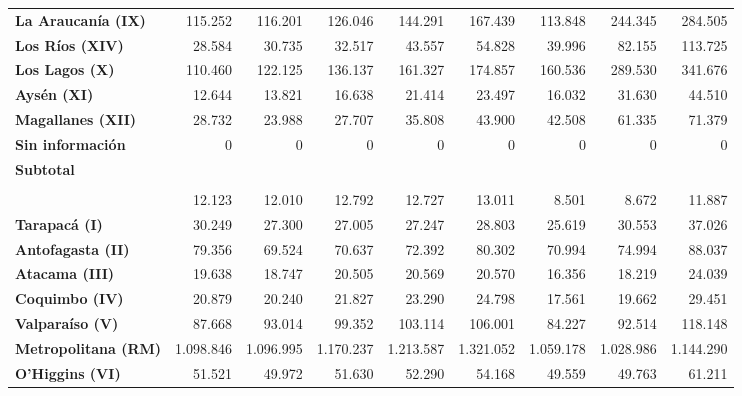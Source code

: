 \documentclass[
  letterpaper,
  DIV=11,
  numbers=noendperiod]{scrartcl}
\begin{document}
\begin{table}
\begin{tabular*}{\linewidth}{@{\extracolsep{\fill}}l|rrrrrrrr}
{\bfseries La Araucanía (IX)} & 115.252 & 116.201 & 126.046 & 144.291 & 167.439 & 113.848 & 244.345 & 284.505 \\ 
{\bfseries Los Ríos (XIV)} & 28.584 & 30.735 & 32.517 & 43.557 & 54.828 & 39.996 & 82.155 & 113.725 \\ 
{\bfseries Los Lagos (X)} & 110.460 & 122.125 & 136.137 & 161.327 & 174.857 & 160.536 & 289.530 & 341.676 \\ 
{\bfseries Aysén (XI)} & 12.644 & 13.821 & 16.638 & 21.414 & 23.497 & 16.032 & 31.630 & 44.510 \\ 
{\bfseries Magallanes (XII)} & 28.732 & 23.988 & 27.707 & 35.808 & 43.900 & 42.508 & 61.335 & 71.379 \\ 
{\bfseries Sin información} & 0 & 0 & 0 & 0 & 0 & 0 & 0 & 0 \\ 
{\bfseries Subtotal} & {\bfseries \cellcolor[HTML]{F2F2F2}{3.159.058}} & {\bfseries \cellcolor[HTML]{F2F2F2}{3.348.560}} & {\bfseries \cellcolor[HTML]{F2F2F2}{3.664.072}} & {\bfseries \cellcolor[HTML]{F2F2F2}{4.005.604}} & {\bfseries \cellcolor[HTML]{F2F2F2}{4.311.164}} & {\bfseries \cellcolor[HTML]{F2F2F2}{4.310.302}} & {\bfseries \cellcolor[HTML]{F2F2F2}{6.368.309}} & {\bfseries \cellcolor[HTML]{F2F2F2}{7.049.916}} \\ 
\midrule\addlinespace[2.5pt]
\multicolumn{9}{l}{{\bfseries ISAPRE​}} \\[2.5pt] 
\midrule\addlinespace[2.5pt]
{\bfseries Arica y Parinacota (XV)} & 12.123 & 12.010 & 12.792 & 12.727 & 13.011 & 8.501 & 8.672 & 11.887 \\ 
{\bfseries Tarapacá (I)} & 30.249 & 27.300 & 27.005 & 27.247 & 28.803 & 25.619 & 30.553 & 37.026 \\ 
{\bfseries Antofagasta (II)} & 79.356 & 69.524 & 70.637 & 72.392 & 80.302 & 70.994 & 74.994 & 88.037 \\ 
{\bfseries Atacama (III)} & 19.638 & 18.747 & 20.505 & 20.569 & 20.570 & 16.356 & 18.219 & 24.039 \\ 
{\bfseries Coquimbo (IV)} & 20.879 & 20.240 & 21.827 & 23.290 & 24.798 & 17.561 & 19.662 & 29.451 \\ 
{\bfseries Valparaíso (V)} & 87.668 & 93.014 & 99.352 & 103.114 & 106.001 & 84.227 & 92.514 & 118.148 \\ 
{\bfseries Metropolitana (RM)} & 1.098.846 & 1.096.995 & 1.170.237 & 1.213.587 & 1.321.052 & 1.059.178 & 1.028.986 & 1.144.290 \\ 
{\bfseries O'Higgins (VI)} & 51.521 & 49.972 & 51.630 & 52.290 & 54.168 & 49.559 & 49.763 & 61.211 \\ 

\end{tabular*}
\end{table}
\end{document}
